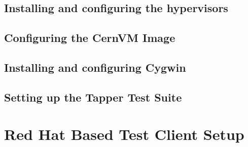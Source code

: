 \subsection{Installing and configuring the hypervisors}
\subsection{Configuring the CernVM Image}
\subsection{Installing and configuring Cygwin}
\subsection{Setting up the Tapper Test Suite}





\section{Red Hat Based Test Client Setup}

